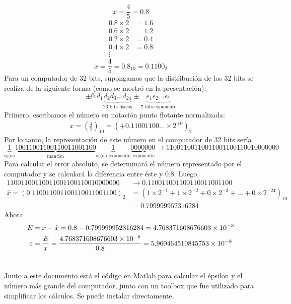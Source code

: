 \section{}

\begin{equation*}
x=\frac{4}{5}=0.8
\end{equation*}
\begin{align*}
0.8\times2&=\boxed{1}.6\\
0.6\times2&=\boxed{1}.2\\
0.2\times2&=\boxed{0}.4\\
0.4\times2&=\boxed{0}.8\\
\vdots
\end{align*}
\begin{equation*}
x=\frac{4}{5}=0.8_{10}=0.\overline{1100}_{2}
\end{equation*}
Para un computador de 32 bits, supongamos que la distribución de los 32 bits se realiza de la siguiente forma (como se mostró en la presentación):
\begin{equation*}
    \pm 0.d_1\underset {\text{23 bits físicos}}{\underbrace{d_2d_3...d_24}}\pm \underset {\text{7 bits exponente}}{\underbrace{e_1e_2...e_7}}
\end{equation*}
Primero, escribamos el número en notación punto flotante normalizada:
\begin{align*}
    x=\left(\frac{4}{5}\right)_{10}=\left(+0.11001100...\times2^{+0}\right)_2
\end{align*}
Por lo tanto, la representación de este número en el computador de 32 bits sería
\begin{equation*}
    \underset {\text{signo}}{\underbrace{1}}\underset {\text{mantisa}}{\underbrace{10011001100110011001100}}\underset{\text{signo exponente}}{\underbrace{1}}\underset{\text{ exponente}}{\underbrace{0000000}}\rightarrow 11001100110011001100110010000000
\end{equation*}
Para calcular el error absoluto, se determinará el número representado por el computador y se calculará la diferencia entre éste y $0.8$. Luego,
\begin{align*}
    11001100110011001100110010000000&\longrightarrow0.110011001100110011001100\\
    \hat{x}=(0.110011001100110011001100)_2&=(1\times2^{-1}+1\times2^{-2}+0\times2^{-3}+...+0\times2^{-24})_{10}\\
    &=0.799999952316284
\end{align*}
Ahora
\begin{align*}
    E &=x-\Hat{x}= 0.8-0.799999952316284=4.768371608676603\times10^{-8}\\\varepsilon&=\frac{E}{x}=\frac{4.768371608676603\times10^{-8}}{0.8}=5.960464510845753\times10^{-8}
\end{align*}
\section{}
Junto a este documento está el código en Matlab para calcular el épsilon y el número más grande del computador, junto con un toolbox \cite{vpi} que fue utilizado para simplificar los cálculos. Se puede instalar directamente.
